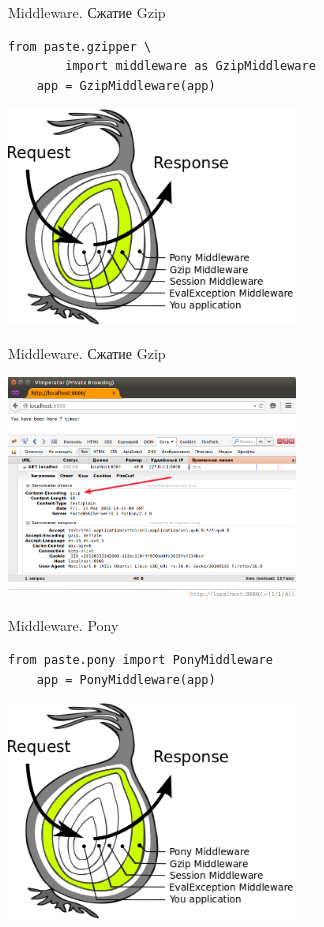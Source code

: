 \begin{frame}[fragile]{Middleware. Сжатие Gzip}
    \begin{lstlisting}[style=python]
    from paste.gzipper \
        import middleware as GzipMiddleware
    app = GzipMiddleware(app)
    \end{lstlisting}
    \begin{center}
        \includegraphics[width=3in]{media/wsgi_as_onion_gzip.png}
    \end{center}
\end{frame}

\begin{frame}{Middleware. Сжатие Gzip}
    \begin{center}
        \includegraphics[width=3in]{media/wsgi_example_gzip.png}
    \end{center}
\end{frame}

\begin{frame}[fragile]{Middleware. Pony}
    \begin{lstlisting}[style=python]
    from paste.pony import PonyMiddleware
    app = PonyMiddleware(app)
    \end{lstlisting}
    \begin{center}
        \includegraphics[width=3in]{media/wsgi_as_onion_pony.png}
    \end{center}
\end{frame}


